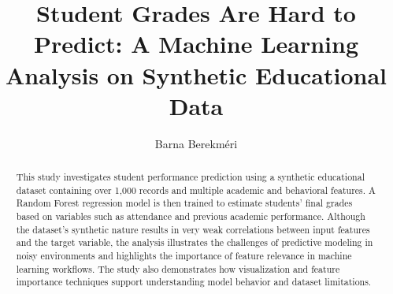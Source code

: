\documentclass{IEEEmce}
\begin{document}


\title{Student Grades Are Hard to Predict: A Machine Learning Analysis on Synthetic Educational Data}


\author{Barna Berekméri}







\begin{abstract} This study investigates student performance prediction using a synthetic educational dataset containing over 1,000 records and multiple academic and behavioral features. A Random Forest regression model \cite{breiman2001randomforest} is then trained to estimate students’ final grades based on variables such as attendance and previous academic performance. Although the dataset’s synthetic nature results in very weak correlations between input features and the target variable, the analysis illustrates the challenges of predictive modeling in noisy environments and highlights the importance of feature relevance in machine learning workflows. The study also demonstrates how visualization and feature importance techniques support understanding model behavior and dataset limitations.\end{abstract}

\maketitle
\end{document}
